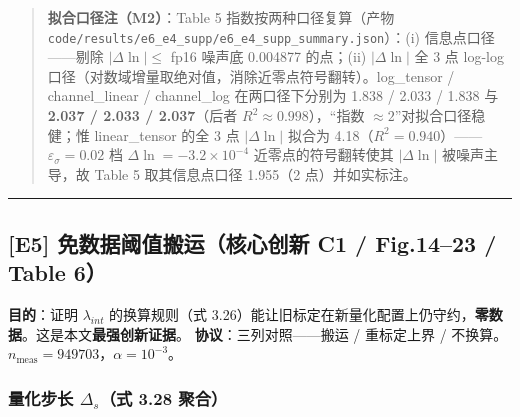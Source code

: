 \begin{quote}
\textbf{拟合口径注（M2）}：Table 5 指数按两种口径复算（产物
\texttt{code/results/e6\_e4\_supp/e6\_e4\_supp\_summary.json}）：(i)
信息点口径------剔除 \(|\Delta\ln|\le\) fp16 噪声底 0.004877 的点；(ii)
\(|\Delta\ln|\) 全 3 点 log-log
口径（对数域增量取绝对值，消除近零点符号翻转）。log\_tensor /
channel\_linear / channel\_log 在两口径下分别为 1.838 / 2.033 / 1.838 与
\textbf{2.037 / 2.033 / 2.037}（后者 \(R^2\approx0.998\)），``指数
\(\approx2\)''对拟合口径稳健；惟 linear\_tensor 的全 3 点
\(|\Delta\ln|\) 拟合为
4.18（\(R^2=0.940\)）------\(\varepsilon_\sigma=0.02\) 档
\(\Delta\ln=-3.2{\times}10^{-4}\) 近零点的符号翻转使其 \(|\Delta\ln|\)
被噪声主导，故 Table 5 取其信息点口径 1.955（2 点）并如实标注。
\end{quote}

\begin{center}\rule{0.5\linewidth}{0.5pt}\end{center}

\subsection{{[}E5{]} 免数据阈值搬运（核心创新 C1 / Fig.14--23 / Table
6）}\label{e5-ux514dux6570ux636eux9608ux503cux642cux8fd0ux6838ux5fc3ux521bux65b0-c1-fig.1423-table-6}

\textbf{目的}：证明 \(\lambda_{int}\) 的换算规则（式
3.26）能让旧标定在新量化配置上仍守约，\textbf{零数据}。这是本文\textbf{最强创新证据}。
\textbf{协议}：三列对照------搬运 / 重标定上界 /
不换算。\(n_{\mathrm{meas}}=949703\)，\(\alpha=10^{-3}\)。

\subsubsection{\texorpdfstring{量化步长 \(\Delta_s\)（式 3.28
聚合）}{量化步长 \textbackslash Delta\_s（式 3.28 聚合）}}\label{ux91cfux5316ux6b65ux957f-delta_sux5f0f-3.28-ux805aux5408}

